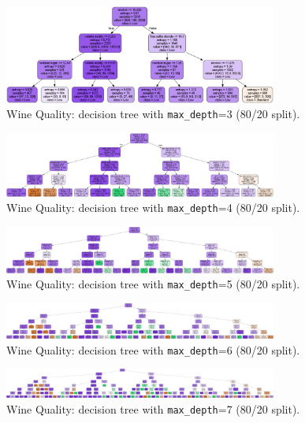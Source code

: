 \begin{figure}[H]
	\centering
	\includegraphics[width=0.8\textwidth]{imgs/dt/dt__wine_quality__80_vs_20__3.png}
	\caption{Wine Quality: decision tree with \texttt{max\_depth}=3 (80/20 split).}
	\label{fig:wq-dt-depth-3}
\end{figure}

\begin{figure}[H]
	\centering
	\includegraphics[width=0.8\textwidth]{imgs/dt/dt__wine_quality__80_vs_20__4.png}
	\caption{Wine Quality: decision tree with \texttt{max\_depth}=4 (80/20 split).}
	\label{fig:wq-dt-depth-4}
\end{figure}

\begin{figure}[H]
	\centering
	\includegraphics[width=0.8\textwidth]{imgs/dt/dt__wine_quality__80_vs_20__5.png}
	\caption{Wine Quality: decision tree with \texttt{max\_depth}=5 (80/20 split).}
	\label{fig:wq-dt-depth-5}
\end{figure}

\begin{figure}[H]
	\centering
	\includegraphics[width=0.8\textwidth]{imgs/dt/dt__wine_quality__80_vs_20__6.png}
	\caption{Wine Quality: decision tree with \texttt{max\_depth}=6 (80/20 split).}
	\label{fig:wq-dt-depth-6}
\end{figure}

\begin{figure}[H]
	\centering
	\includegraphics[width=0.8\textwidth]{imgs/dt/dt__wine_quality__80_vs_20__7.png}
	\caption{Wine Quality: decision tree with \texttt{max\_depth}=7 (80/20 split).}
	\label{fig:wq-dt-depth-7}
\end{figure}

